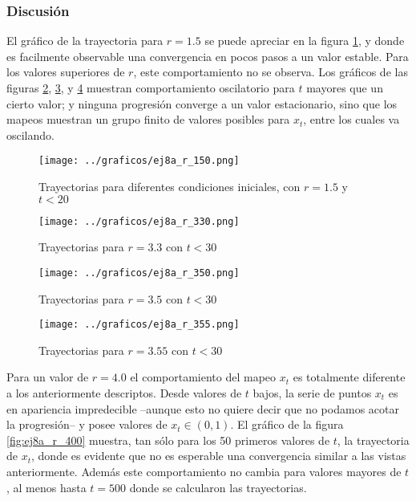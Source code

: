 \documentclass[a4paper,10pt]{paper}
\begin{document}
\subsubsection{Discusi\'on}
El gr\'afico de la trayectoria para $r = 1.5$ se puede apreciar en la figura \ref{fig:ej8a_r_150}, 
y donde es facilmente observable una convergencia en pocos pasos a un valor estable.
Para los valores superiores de $r$, este comportamiento no se observa.
Los gr\'aficos de las figuras \ref{fig:ej8a_r_330}, \ref{fig:ej8a_r_350}, y \ref{fig:ej8a_r_355} muestran comportamiento
oscilatorio para $t$ mayores que un cierto valor; y ninguna progresi\'on converge a un valor estacionario, sino que 
los mapeos muestran un grupo finito de valores posibles para $x_t$, entre los cuales va oscilando.
\begin{figure}[H]
 \centering
 \texttt{[image: ../graficos/ej8a\_r\_150.png]}
 \caption{Trayectorias para diferentes condiciones iniciales, con $r=1.5$ y $t<20$}
 \label{fig:ej8a_r_150}
\end{figure}
\begin{figure}[H]
 \centering
 \texttt{[image: ../graficos/ej8a\_r\_330.png]}
 \caption{Trayectorias para $r=3.3$ con $t<30$}
 \label{fig:ej8a_r_330}
\end{figure}
\begin{figure}[H]
 \centering
 \texttt{[image: ../graficos/ej8a\_r\_350.png]}
 \caption{Trayectorias para $r=3.5$ con $t<30$}
 \label{fig:ej8a_r_350}
\end{figure}
\begin{figure}[H]
 \centering
 \texttt{[image: ../graficos/ej8a\_r\_355.png]}
 \caption{Trayectorias para $r=3.55$ con $t<30$}
 \label{fig:ej8a_r_355}
\end{figure}

Para un valor de $r=4.0$ el comportamiento del mapeo $x_t$ es totalmente diferente a los anteriormente
descriptos. Desde valores de $t$ bajos, la serie de puntos $x_t$ es en apariencia impredecible --aunque
esto no quiere decir que no podamos acotar la progresi\'on-- y posee valores de $x_t \in (0, 1)$.
El gr\'afico de la figura  \ref{fig:ej8a_r_400} muestra, tan s\'olo para los 50 primeros valores de $t$, 
la trayectoria de $x_t$, donde es evidente que no es esperable una convergencia similar a las vistas anteriormente.
Adem\'as este comportamiento no cambia para valores mayores de $t$, al menos hasta $t=500$ donde se calcularon
las trayectorias.
\end{document}
